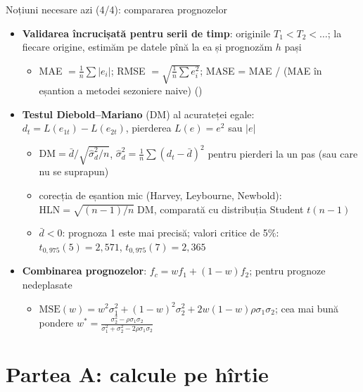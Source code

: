 \begin{frame}{Noțiuni necesare azi (4/4): compararea prognozelor}
\itemsize{\footnotesize}
\begin{itemize}
    \item \textbf{Validarea încrucișată pentru serii de timp}: originile $T_1 < T_2 < \dots$; la fiecare origine, estimăm pe datele pînă la ea și prognozăm $h$ pași
    \begin{itemize}
        \item MAE $= \frac1n\sum|e_i|$; RMSE $= \sqrt{\frac1n\sum e_i^2}$; MASE = MAE / (MAE în eșantion a metodei sezoniere naive) ()
    \end{itemize}
    \item \textbf{Testul Diebold--Mariano} (DM) al acurateței egale: $d_t = L(e_{1t}) - L(e_{2t})$, pierderea $L(e) = e^2$ sau $|e|$
    \begin{itemize}
        \item $\mathrm{DM} = \bar d/\sqrt{\hat\sigma_d^2/n}$, $\hat\sigma_d^2 = \frac1n\sum(d_t - \bar d)^2$ pentru pierderi la un pas (sau care nu se suprapun)
        \item corecția de eșantion mic (Harvey, Leybourne, Newbold): $\mathrm{HLN} = \sqrt{(n - 1)/n}\;\mathrm{DM}$, comparată cu distribuția Student $t(n - 1)$
        \item $\bar d < 0$: prognoza 1 este mai precisă; valori critice de 5\%: $t_{0{,}975}(5) = 2{,}571$, $t_{0{,}975}(7) = 2{,}365$
    \end{itemize}
    \item \textbf{Combinarea prognozelor}: $f_c = w f_1 + (1 - w)f_2$; pentru prognoze nedeplasate
    \begin{itemize}
        \item $\mathrm{MSE}(w) = w^2\sigma_1^2 + (1 - w)^2\sigma_2^2 + 2w(1 - w)\rho\sigma_1\sigma_2$; cea mai bună pondere $w^* = \frac{\sigma_2^2 - \rho\sigma_1\sigma_2}{\sigma_1^2 + \sigma_2^2 - 2\rho\sigma_1\sigma_2}$
    \end{itemize}
\end{itemize}
\end{frame}


\section{Partea A: calcule pe hîrtie}

